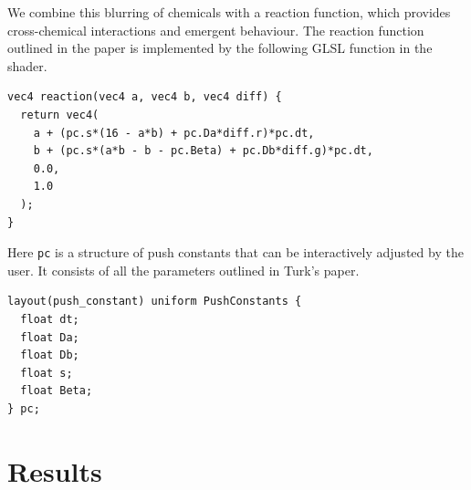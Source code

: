 \documentclass[a4paper, 11pt, titlepage]{article}
\begin{document}
We combine this blurring of chemicals with a reaction function, which provides
cross-chemical interactions and emergent behaviour. The reaction function
outlined in the paper is implemented by the following GLSL function in the
shader.

\begin{verbatim}
vec4 reaction(vec4 a, vec4 b, vec4 diff) {
  return vec4(
    a + (pc.s*(16 - a*b) + pc.Da*diff.r)*pc.dt,
    b + (pc.s*(a*b - b - pc.Beta) + pc.Db*diff.g)*pc.dt,
    0.0,
    1.0
  );
}
\end{verbatim}
Here \texttt{pc} is a structure of push constants that can be interactively
adjusted by the user. It consists of all the parameters outlined in
Turk's paper.

\begin{verbatim}
layout(push_constant) uniform PushConstants {
  float dt;
  float Da;
  float Db;
  float s;
  float Beta;
} pc;
\end{verbatim}



\section{Results}
\end{document}
